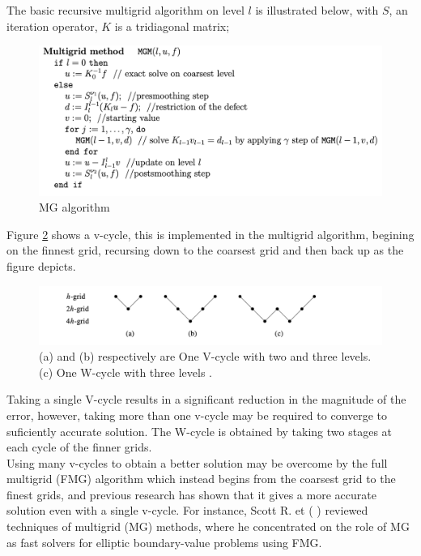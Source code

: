 \documentclass[12pt,a4paper]{article}
\begin{document}
		\noindent The basic recursive multigrid algorithm on level $l$  is illustrated below, with $S$, an iteration operator, $K$ is a tridiagonal matrix;
	\begin{figure}[H]
		\centering
		\includegraphics[width=0.7\linewidth]{"Screenshot 2021-03-19 at 4.33.38 AM"}
		\caption{MG algorithm \cite{trottenberg2000multigrid}}
		\label{fig:screenshot-2021-03-19-at-4 }
	\end{figure}
	
	
		\noindent Figure \ref{fig:v-cycle} shows a v-cycle, this is implemented in the multigrid algorithm, begining on the finnest grid, recursing  down to the coarsest grid and then back up as the figure depicts.
	
	\begin{figure}[H]
		\centering
		\includegraphics[width=0.7\linewidth]{"Screenshot 2021-03-19 at 12.46.08 AM"}
		\caption{(a) and (b)  respectively are One V-cycle with two and three levels. (c) One W-cycle with three levels 	\cite{leveque2007finite}.}
		\label{fig:v-cycle}
	\end{figure}

		\noindent Taking a single V-cycle results in a significant reduction in the magnitude of the error, however, taking more than one v-cycle may be required to converge to suficiently accurate solution\cite{leveque2007finite}. The W-cycle is obtained by taking two stages at each cycle of the finner grids. \\
	
		\noindent Using many v-cycles to obtain a better solution may be overcome by the full multigrid (FMG) algorithm which instead begins from the coarsest grid to the finest grids, and previous research has shown that it  gives a more accurate solution even with a single v-cycle. For instance, Scott R. et (\cite{fulton1986multigrid} ) reviewed techniques of multigrid (MG) methods, where he concentrated on the role of  MG as fast solvers for elliptic boundary-value problems using FMG. \\
	
\end{document}
